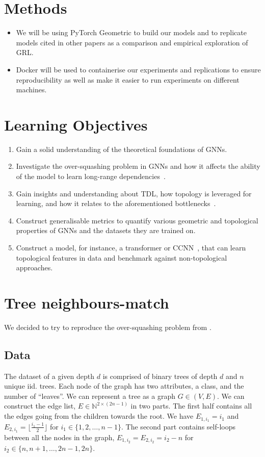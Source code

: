 \documentclass[a4paper,12pt]{article}
\begin{document}
\section{Methods}
\begin{itemize}
	\item  We will be using PyTorch Geometric to build our models and to replicate models cited in other papers as a comparison and empirical exploration of GRL.
	\item Docker will be used to containerise our experiments and replications to ensure reproducibility as well as make it easier to run experiments on different machines.
\end{itemize}

\section{Learning Objectives}


\begin{enumerate}
	\item Gain a solid understanding of the theoretical foundations of GNNs.
	\item Investigate the over-squashing problem in GNNs and how it affects the ability of the model to learn long-range dependencies~\cite{alon_bottleneck_2021}.
	\item Gain insights and understanding about TDL, how topology is leveraged for learning, and how it relates to the aforementioned bottlenecks~\cite{horn_topological_2022}.
	\item Construct generalisable metrics to quantify various geometric and topological properties of GNNs and the datasets they are trained on.
	\item Construct a model, for instance, a transformer or CCNN~\cite{tdlbook}, that can learn topological features in data and benchmark against non-topological approaches.
\end{enumerate}

\section{Tree neighbours-match}
We decided to try to reproduce the over-squashing problem from \cite{alon_bottleneck_2021}.
\subsection{Data}
The dataset of a given depth $d$ is comprised of binary trees of depth $d$ and $n$ unique iid. trees. Each node of the graph has two attributes, a class, and the number of ``leaves''. We can represent a tree as a graph $G \in (V, E)$. We can construct the edge list, $E \in \mathbb{N}^{2 \times (2n-1)}$ in two parts. The first half contains all the edges going from the children towards the root. We have $E_{1, i_{1}}=i_{1}$ and $E_{2, i_{1}} = \lfloor \frac{i_{1}-1}{2} \rfloor$ for $i_{1} \in \{1, 2, \ldots, n-1\}$. The second part contains self-loops between all the nodes in the graph, $E_{1, i_{2}} = E_{2, i_{2}}=i_{2}-n$ for $i_{2} \in \{n, n+1, \ldots, 2n-1, 2n\}$.
\end{document}
